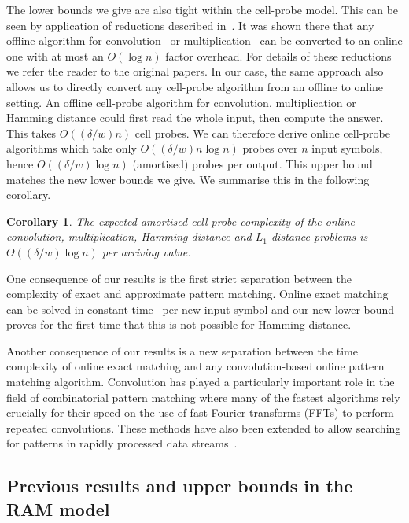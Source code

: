 \documentclass[11pt]{article}
\numberwithin{equation}{section}
\newtheorem{corollary}[theorem]{Corollary}
\theoremstyle{definition}
\theoremstyle{plain}
\begin{document}
The lower bounds we give are also tight within the cell-probe model. This can be seen by application of reductions described in~\cite{FS:1973, CEPP:2011}.  It was shown there that any offline algorithm for convolution~\cite{CEPP:2011} or multiplication~\cite{FS:1973} can be converted to an online one with at most an $O(\log{n})$ factor overhead. For details of these reductions we refer the reader to the original papers.  In our case, the same approach also allows us to directly convert any cell-probe algorithm from an offline to online setting. An offline cell-probe algorithm for convolution, multiplication or Hamming distance could first read the whole input, then compute the
%
answer.
%
This takes $O{(({\delta}/{w}) n)}$ cell probes. We can therefore derive online cell-probe algorithms which take only $O{(({\delta}/{w})n\log n)}$ probes over $n$ input symbols, hence $O{(({\delta}/{w})\log n)}$ (amortised) probes per output. This upper bound matches the new lower bounds we give.
We summarise this in the following corollary.
%

\begin{corollary}\label{cor:final}
	The expected amortised cell-probe complexity of the online convolution, multiplication, Hamming distance and $L_1$-distance problems is $\Theta(({\delta}/{w})\log n)$ per arriving value.
\end{corollary}

One consequence of our results is the first strict separation between the complexity of exact and approximate pattern matching.  Online exact matching can be solved in constant time~\cite{Galil:1981} per new input symbol and our new lower bound proves for the first time that this is not possible for Hamming distance.

%

Another consequence of our results is a new separation between the time complexity of online exact matching and any convolution-based online pattern matching algorithm. Convolution has played a particularly important role in the field of combinatorial pattern matching where many of the fastest algorithms rely crucially for their speed on the use of fast Fourier transforms (FFTs) to perform repeated convolutions. These methods have also been extended to allow searching for patterns in rapidly processed data streams~\cite{CEPP:2011,CS:2011}.


\subsection{Previous results and upper bounds in the RAM model} \label{sec:previous}
\end{document}
